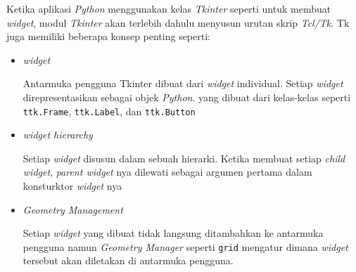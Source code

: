Ketika aplikasi \textit{Python} menggunakan kelas \textit{Tkinter} seperti untuk membuat \textit{widget}, modul \textit{Tkinter} akan terlebih dahulu menyusun urutan skrip \textit{Tcl/Tk}. Tk juga memiliki beberapa konsep penting seperti:
\begin{itemize}
    \item \textit{widget}

    Antarmuka pengguna Tkinter dibuat dari \textit{widget} individual. Setiap \textit{widget} direpresentasikan sebagai objek \textit{Python}. yang dibuat dari kelas-kelas seperti \verb|ttk.Frame|, \verb|ttk.Label|, dan \verb|ttk.Button|

    \item \textit{widget hierarchy}

    Setiap \textit{widget} disusun dalam sebuah hierarki. Ketika membuat setiap \textit{child widget}, \textit{parent widget} nya dilewati sebagai argumen pertama dalam konsturktor \textit{widget} nya 

    \item \textit{Geometry Management}

    Setiap \textit{widget} yang dibuat tidak langsung ditambahkan ke antarmuka pengguna namun \textit{Geometry Manager} seperti \verb|grid| mengatur dimana \textit{widget} tersebut akan diletakan di antarmuka pengguna.
\end{itemize}